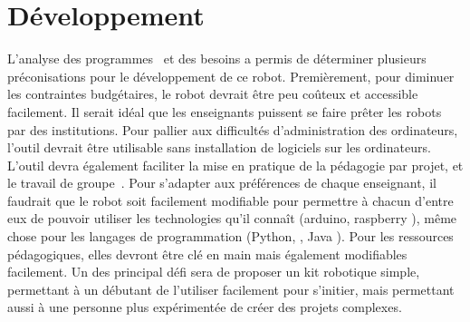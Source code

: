 \section{Développement}\label{sec:devellopement}
        L'analyse des programmes~ et des besoins
        a permis de déterminer plusieurs préconisations pour le développement de ce robot.
        Premièrement, pour diminuer les contraintes budgétaires, le robot devrait être peu coûteux et accessible facilement. Il serait idéal que les enseignants puissent se faire prêter les robots par des institutions. 
        Pour pallier aux difficultés d'administration des ordinateurs, l'outil devrait être utilisable sans installation de logiciels sur les ordinateurs.
        L'outil devra également faciliter la mise en pratique de la pédagogie par projet, et le travail de groupe~. Pour s'adapter aux préférences de chaque enseignant, il faudrait que le robot soit facilement modifiable pour permettre à chacun d'entre eux de pouvoir utiliser les technologies qu'il connaît (arduino, raspberry \etc), même chose pour les langages de programmation (Python, , Java \etc). Pour les ressources pédagogiques, elles devront être clé en main mais également modifiables facilement.
        Un des principal défi sera de proposer un kit robotique simple, permettant à un débutant de l'utiliser facilement pour s'initier, mais permettant aussi à une personne plus expérimentée de créer des projets complexes.
